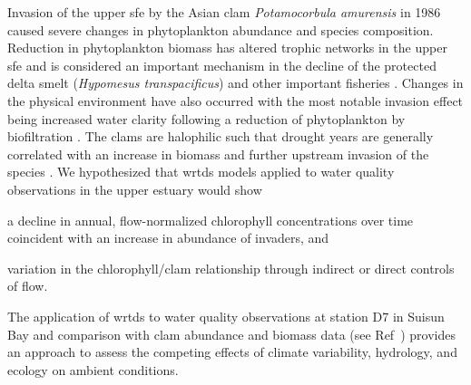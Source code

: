 \documentclass[journal = esthag, manuscript = article]{achemso}\usepackage[]{graphicx}\usepackage[]{color}
\begin{document}
Invasion of the upper \ac{sfe} by the Asian clam \textit{Potamocorbula amurensis} in 1986 caused severe changes in phytoplankton abundance and species composition.  Reduction in phytoplankton biomass has altered trophic networks in the upper \ac{sfe} and is considered an important mechanism in the decline of the protected delta smelt (\textit{Hypomesus transpacificus}) and other important fisheries \cite{Feyrer03,MacNally10}.  Changes in the physical environment have also occurred with the most notable invasion effect being increased water clarity following a reduction of phytoplankton by biofiltration \cite{MacNally10}. The clams are halophilic such that drought years are generally correlated with an increase in biomass and further upstream invasion of the species \cite{Parchaso02,Cloern12b}. We hypothesized that \ac{wrtds} models applied to water quality observations in the upper estuary would show \begin{inparaenum}[1\upshape)]
\item a decline in annual, flow-normalized chlorophyll concentrations over time coincident with an increase in abundance of invaders, and
\item variation in the chlorophyll/clam relationship through indirect or direct controls of flow.
\end{inparaenum}
The application of \ac{wrtds} to water quality observations at station D7 in Suisun Bay and comparison with clam abundance and biomass data (see Ref~) provides an approach to assess the competing effects of climate variability, hydrology, and ecology on ambient conditions.
\end{document}
